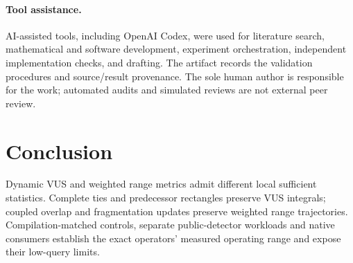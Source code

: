 \paragraph{Tool assistance.}
AI-assisted tools, including OpenAI Codex, were used for literature search,
mathematical and software development, experiment orchestration, independent
implementation checks, and drafting. The artifact records the validation
procedures and source/result provenance. The sole human author is responsible
for the work; automated audits and simulated reviews are not external peer
review.

\section{Conclusion}
Dynamic VUS and weighted range metrics admit different local sufficient
statistics. Complete ties and predecessor rectangles preserve VUS integrals;
coupled overlap and fragmentation updates preserve weighted range trajectories.
Compilation-matched controls, separate public-detector workloads and native
consumers establish the exact operators' measured operating range and expose
their low-query limits.
